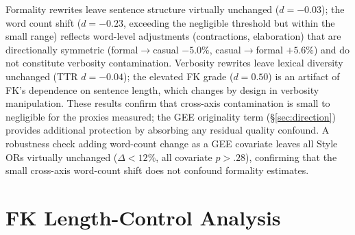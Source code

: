 \begin{table}[h]
\centering
\small
\caption{Cross-axis contamination: effect of rewriting along one style axis on surface proxies of the other axis. Cohen's $d$: $|d| < 0.20$ negligible, $0.20$--$0.50$ small contamination \citep{cohen1988statistical}.}
\label{tab:cross_axis}
\end{table}

Formality rewrites leave sentence structure virtually unchanged ($d = -0.03$); the word count shift ($d = -0.23$, exceeding the negligible threshold but within the small range) reflects word-level adjustments (contractions, elaboration) that are directionally symmetric (formal$\to$casual $-5.0\%$, casual$\to$formal $+5.6\%$) and do not constitute verbosity contamination.
Verbosity rewrites leave lexical diversity unchanged (TTR $d = -0.04$); the elevated FK grade ($d = 0.50$) is an artifact of FK's dependence on sentence length, which changes by design in verbosity manipulation.
These results confirm that cross-axis contamination is small to negligible for the proxies measured; the GEE originality term (\S\ref{sec:direction}) provides additional protection by absorbing any residual quality confound.
A robustness check adding word-count change as a GEE covariate leaves all Style ORs virtually unchanged ($\Delta < 12\%$, all covariate $p > .28$), confirming that the small cross-axis word-count shift does not confound formality estimates.

\section{FK Length-Control Analysis}
\label{app:fk_length}

